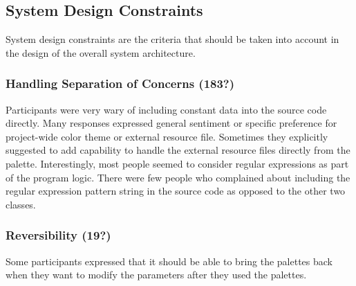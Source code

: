 \documentclass[conference]{IEEEtran}
\begin{document}
\subsection{System Design Constraints}

System design constraints are the criteria that should be taken into account in the design of the overall system architecture.

\subsubsection{Handling Separation of Concerns (183?)}

Participants were very wary of including constant data into the source code directly. Many responses expressed general sentiment or specific preference for project-wide color theme or external resource file. Sometimes they explicitly suggested to add capability to handle the external resource files directly from the palette. Interestingly, most people seemed to consider regular expressions as part of the program logic. There were few people who complained about including the regular expression pattern string in the source code as opposed to the other two classes.

%
 
\subsubsection{Reversibility (19?)}

Some participants expressed that it should be able to bring the palettes back when they want to modify the parameters after they used the palettes.
 
\end{document}
